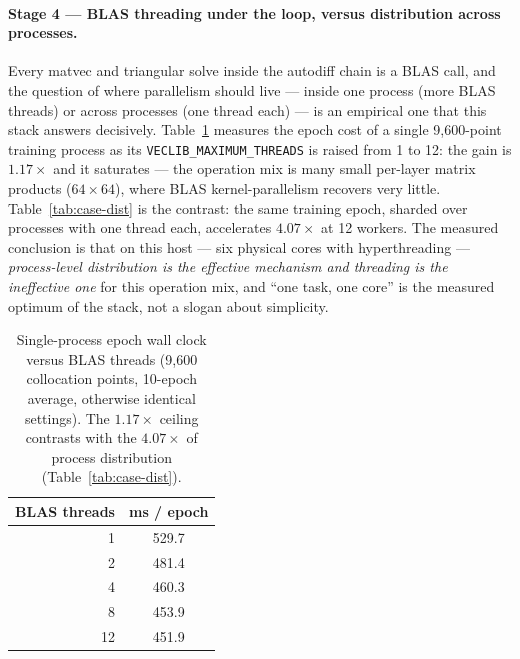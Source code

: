 \documentclass[11pt,a4paper]{article}
\theoremstyle{plain}
\theoremstyle{definition}
\begin{document}
\paragraph{Stage 4 --- BLAS threading under the loop, versus
distribution across processes.}
Every matvec and triangular solve inside the autodiff chain is a BLAS
call, and the question of where parallelism should live --- inside one
process (more BLAS threads) or across processes (one thread each) --- is
an empirical one that this stack answers decisively.
Table~\ref{tab:case-threads} measures the epoch cost of a single
9{,}600-point training process as its \texttt{VECLIB\_MAXIMUM\_THREADS}
is raised from 1 to 12: the gain is $1.17\times$ and it
saturates --- the operation mix is many small per-layer matrix products
($64\times64$), where BLAS kernel-parallelism recovers very little.
Table~\ref{tab:case-dist} is the contrast: the same training epoch,
sharded over processes with one thread each, accelerates $4.07\times$
at 12 workers.  The measured conclusion is that on this host --- six
physical cores with hyperthreading --- \emph{process-level distribution
is the effective mechanism and threading is the ineffective one} for
this operation mix, and ``one task, one core'' is the measured optimum
of the stack, not a slogan about simplicity.

\begin{table}[h]
\centering
\caption{Single-process epoch wall clock versus BLAS threads
(9{,}600 collocation points, 10-epoch average, otherwise identical
settings).  The $1.17\times$ ceiling contrasts with the
$4.07\times$ of process distribution (Table~\protect\ref{tab:case-dist}).}
\begin{tabular}{rc}
\toprule
\textbf{BLAS threads} & \textbf{ms / epoch} \\
\midrule
1  & 529.7 \\
2  & 481.4 \\
4  & 460.3 \\
8  & 453.9 \\
12 & 451.9 \\
\bottomrule
\end{tabular}
\label{tab:case-threads}
\end{table}
\end{document}
